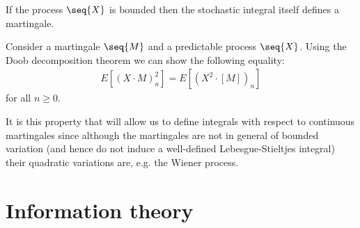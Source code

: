     \begin{property}
        If the process $\seq{X}$ is bounded then the stochastic integral itself defines a martingale.
    \end{property}

    \begin{property}[It\^o isometry]
        Consider a martingale $\seq{M}$ and a predictable process $\seq{X}$. Using the Doob decomposition theorem we can show the following equality:
        \begin{gather}
            E\left[\left(X\cdot M\right)_n^2\right] = E\left[(X^2\cdot[M])_n\right]
        \end{gather}
        for all $n\geq0$.
    \end{property}

    It is this property that will allow us to define integrals with respect to continuous martingales since although the martingales are not in general of bounded variation (and hence do not induce a well-defined Lebesgue-Stieltjes integral) their quadratic variations are, e.g. the Wiener process.

\section{Information theory}

